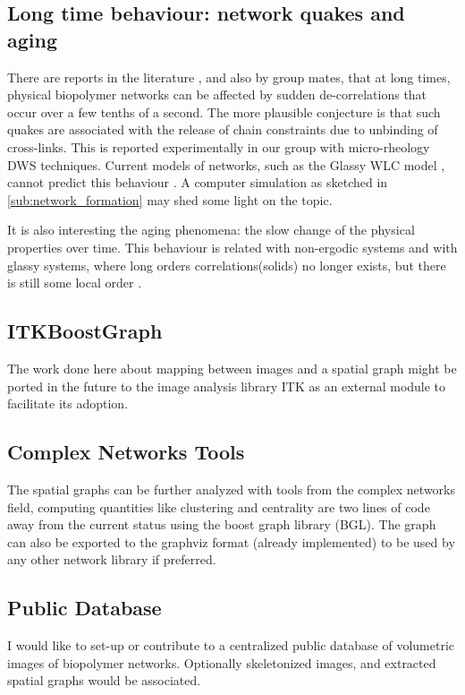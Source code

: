 \subsection{Long time behaviour: network quakes and aging}
\label{sub:quakes}
There are reports in the literature \citep{kajiya_slow_2013}, and also by group
mates\citep{vincent_micro-rheological_2013, mansel_internal_2015}, that at long times, physical
biopolymer networks can be affected by sudden de-correlations that occur over a
few tenths of a second. The more plausible conjecture is that such quakes are associated with the release of
chain constraints due to unbinding of cross-links.  This is reported
experimentally in our group  with micro-rheology DWS techniques.
Current models of networks, such as the Glassy WLC model
\citep{kroy_glassy_2007}, cannot predict this behaviour \citep{vincent_micro-rheological_2013}.  A
computer simulation as sketched in \autoref{sub:network_formation} may shed some light on the topic.

It is also interesting the aging phenomena: the slow change of the physical
properties over time. This behaviour is related with non-ergodic systems and
with glassy systems, where long orders correlations(solids) no longer exists,
but there is still some local order \citep{cipelletti_slow_????}.

\subsection{ITKBoostGraph}%
\label{sub:itkboostgraph}

  The work done here about mapping between images and a spatial graph might be ported in the future to the image analysis library ITK as an external module to facilitate its adoption.

\subsection{Complex Networks Tools}%
\label{sub:complex_networks_tools}

The spatial graphs can be further analyzed with tools from the complex networks field, computing quantities like clustering and centrality are two lines of code away from the current status using the boost graph library (BGL). The graph can also be exported to the graphviz format (already implemented) to be used by any other network library if preferred.

\subsection{Public Database}%
\label{sub:public_database}

  I would like to set-up or contribute to a centralized public database of volumetric images of biopolymer networks. Optionally skeletonized images, and extracted spatial graphs would be associated.
